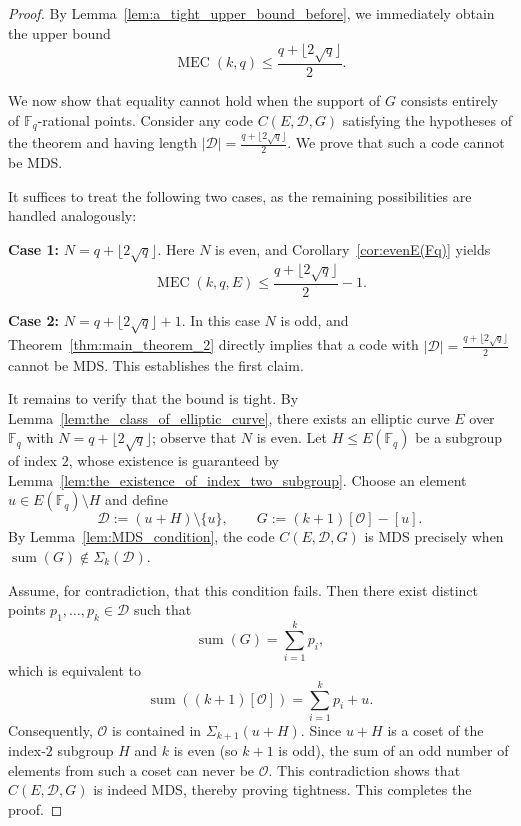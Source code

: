 \documentclass[journal,12pt,onecolumn]{IEEEtran}
\newcommand{\Point}{\operatorname{sum}}
\newcommand{\sumset}{\Sigma}
\begin{document}
\begin{proof}
By Lemma~\ref{lem:a_tight_upper_bound_before}, we immediately obtain the upper bound
\[
\operatorname{MEC}(k, q) \le \frac{q+ \lfloor 2\sqrt{q} \rfloor}{2}.
\]

We now show that equality cannot hold when the support of $G$ consists entirely of $\mathbb{F}_q$-rational points. Consider any code $C(E, \mathcal{D}, G)$ satisfying the hypotheses of the theorem and having length $|\mathcal{D}| = \frac{q+ \lfloor 2\sqrt{q} \rfloor}{2}$. We prove that such a code cannot be MDS.

It suffices to treat the following two cases, as the remaining possibilities are handled analogously:

\noindent\textbf{Case 1:} $N = q + \lfloor 2\sqrt{q} \rfloor$. Here $N$ is even, and Corollary~\ref{cor:evenE(Fq)} yields
\[
\operatorname{MEC}(k, q, E) \le \frac{q + \lfloor 2\sqrt{q}\rfloor}{2} - 1 .
\]

\noindent\textbf{Case 2:} $N = q + \lfloor 2\sqrt{q} \rfloor + 1$. In this case $N$ is odd, and Theorem~\ref{thm:main_theorem_2} directly implies that a code with $|\mathcal{D}| = \frac{q+ \lfloor 2\sqrt{q} \rfloor}{2}$ cannot be MDS. This establishes the first claim.

It remains to verify that the bound is tight. By Lemma~\ref{lem:the_class_of_elliptic_curve}, there exists an elliptic curve $E$ over $\mathbb{F}_q$ with $N = q + \lfloor 2\sqrt{q} \rfloor$; observe that $N$ is even. Let $H \le E(\mathbb{F}_q)$ be a subgroup of index $2$, whose existence is guaranteed by Lemma~\ref{lem:the_existence_of_index_two_subgroup}. Choose an element $u \in E(\mathbb{F}_q) \setminus H$ and define
\[
\mathcal{D} := (u + H) \setminus \{u\}, \qquad G := (k+1)[\mathcal{O}] - [u].
\]
By Lemma~\ref{lem:MDS_condition}, the code $C(E, \mathcal{D}, G)$ is MDS precisely when
$
\Point(G) \notin \sumset_k(\mathcal{D})$.

Assume, for contradiction, that this condition fails. Then there exist distinct points $p_1, \dots, p_k \in \mathcal{D}$ such that
\[
\Point(G) = \sum_{i=1}^k p_i,
\]
which is equivalent to
\[
\Point((k+1)[\mathcal{O}]) = \sum_{i=1}^k p_i + u.
\]
Consequently, $\mathcal{O}$ is contained in 
$
 \sumset_{k+1}(u + H)$.
Since $u + H$ is a coset of the index‑$2$ subgroup $H$ and $k$ is even (so $k+1$ is odd), the sum of an odd number of elements from such a coset can never be $\mathcal{O}$. This contradiction shows that $C(E, \mathcal{D}, G)$ is indeed MDS, thereby proving tightness.
This completes the proof.
\end{proof}
\end{document}
